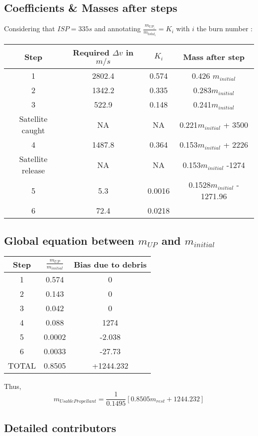 \subsection{Coefficients \& Masses after steps}

Considering that \(ISP = 335s\) and annotating
\(\frac{m_{UP_i}}{m_{total_i}} = K_i\) with \(i\) the burn number :

\begin{longtable}[]{@{}cccc@{}}
\toprule
Step & Required \(\Delta v\) in \(m/s\) & \(K_i\) & Mass after
step\tabularnewline
\midrule
\endhead
1 & 2802.4 & 0.574 & 0.426 \(m_{initial}\)\tabularnewline
2 & 1342.2 & 0.335 & 0.283\(m_{initial}\)\tabularnewline
3 & 522.9 & 0.148 & 0.241\(m_{initial}\)\tabularnewline
Satellite caught & NA & NA & 0.221\(m_{initial}\) + 3500\tabularnewline
4 & 1487.8 & 0.364 & 0.153\(m_{initial}\) + 2226\tabularnewline
Satellite release & NA & NA & 0.153\(m_{initial}\) -1274\tabularnewline
5 & 5.3 & 0.0016 & 0.1528\(m_{initial}\) - 1271.96\tabularnewline
6 & 72.4 & 0.0218 &\tabularnewline
\bottomrule
\end{longtable}


\subsection{\texorpdfstring{Global equation between \(m_{UP}\) and
		\(m_{initial}\)}{Global equation between m\_\{UP\} and m\_\{initial\}}}



\begin{longtable}[]{@{}ccc@{}}
\toprule
Step & \(\frac{m_{UP}}{m_{initial}}\) & Bias due to
debris\tabularnewline
\midrule
\endhead
1 & 0.574 & 0\tabularnewline
2 & 0.143 & 0\tabularnewline
3 & 0.042 & 0\tabularnewline
4 & 0.088 & 1274\tabularnewline
5 & 0.0002 & -2.038\tabularnewline
6 & 0.0033 & -27.73\tabularnewline
TOTAL & 0.8505 & +1244.232\tabularnewline
\bottomrule
\end{longtable}
Thus,
$$
m_{UsablePropellant} = \frac 1{0.1495}[0.8505m_{rest}+1244.232]
$$
\subsection{Detailed contributors}
